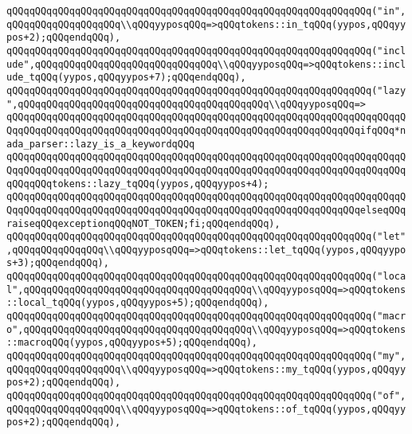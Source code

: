 \verb|qQQqqQQqqQQqqQQqqQQqqQQqqQQqqQQqqQQqqQQqqQQqqQQqqQQqqQQqqQQqqQQq("in",qQQqqQQqqQQqqQQqqQQq\\qQQqyyposqQQq=>qQQqtokens::in_tqQQq(yypos,qQQqyypos+2);qQQqendqQQq),|\newline
\verb|qQQqqQQqqQQqqQQqqQQqqQQqqQQqqQQqqQQqqQQqqQQqqQQqqQQqqQQqqQQqqQQq("include",qQQqqQQqqQQqqQQqqQQqqQQqqQQqqQQq\\qQQqyyposqQQq=>qQQqtokens::include_tqQQq(yypos,qQQqyypos+7);qQQqendqQQq),|\newline
\verb|qQQqqQQqqQQqqQQqqQQqqQQqqQQqqQQqqQQqqQQqqQQqqQQqqQQqqQQqqQQqqQQq("lazy",qQQqqQQqqQQqqQQqqQQqqQQqqQQqqQQqqQQqqQQqqQQq\\qQQqyyposqQQq=>|\newline
\verb|qQQqqQQqqQQqqQQqqQQqqQQqqQQqqQQqqQQqqQQqqQQqqQQqqQQqqQQqqQQqqQQqqQQqqQQqqQQqqQQqqQQqqQQqqQQqqQQqqQQqqQQqqQQqqQQqqQQqqQQqqQQqqQQqqQQqifqQQq*nada_parser::lazy_is_a_keywordqQQq|\newline
\verb|qQQqqQQqqQQqqQQqqQQqqQQqqQQqqQQqqQQqqQQqqQQqqQQqqQQqqQQqqQQqqQQqqQQqqQQqqQQqqQQqqQQqqQQqqQQqqQQqqQQqqQQqqQQqqQQqqQQqqQQqqQQqqQQqqQQqqQQqqQQqqQQqqQQqtokens::lazy_tqQQq(yypos,qQQqyypos+4);|\newline
\verb|qQQqqQQqqQQqqQQqqQQqqQQqqQQqqQQqqQQqqQQqqQQqqQQqqQQqqQQqqQQqqQQqqQQqqQQqqQQqqQQqqQQqqQQqqQQqqQQqqQQqqQQqqQQqqQQqqQQqqQQqqQQqqQQqqQQqelseqQQqraiseqQQqexceptionqQQqNOT_TOKEN;fi;qQQqendqQQq),|\newline
\verb|qQQqqQQqqQQqqQQqqQQqqQQqqQQqqQQqqQQqqQQqqQQqqQQqqQQqqQQqqQQqqQQq("let",qQQqqQQqqQQqqQQq\\qQQqyyposqQQq=>qQQqtokens::let_tqQQq(yypos,qQQqyypos+3);qQQqendqQQq),|\newline
\verb|qQQqqQQqqQQqqQQqqQQqqQQqqQQqqQQqqQQqqQQqqQQqqQQqqQQqqQQqqQQqqQQq("local",qQQqqQQqqQQqqQQqqQQqqQQqqQQqqQQqqQQqqQQq\\qQQqyyposqQQq=>qQQqtokens::local_tqQQq(yypos,qQQqyypos+5);qQQqendqQQq),|\newline
\verb|qQQqqQQqqQQqqQQqqQQqqQQqqQQqqQQqqQQqqQQqqQQqqQQqqQQqqQQqqQQqqQQq("macro",qQQqqQQqqQQqqQQqqQQqqQQqqQQqqQQqqQQqqQQq\\qQQqyyposqQQq=>qQQqtokens::macroqQQq(yypos,qQQqyypos+5);qQQqendqQQq),|\newline
\verb|qQQqqQQqqQQqqQQqqQQqqQQqqQQqqQQqqQQqqQQqqQQqqQQqqQQqqQQqqQQqqQQq("my",qQQqqQQqqQQqqQQqqQQq\\qQQqyyposqQQq=>qQQqtokens::my_tqQQq(yypos,qQQqyypos+2);qQQqendqQQq),|\newline
\verb|qQQqqQQqqQQqqQQqqQQqqQQqqQQqqQQqqQQqqQQqqQQqqQQqqQQqqQQqqQQqqQQq("of",qQQqqQQqqQQqqQQqqQQq\\qQQqyyposqQQq=>qQQqtokens::of_tqQQq(yypos,qQQqyypos+2);qQQqendqQQq),|\newline
